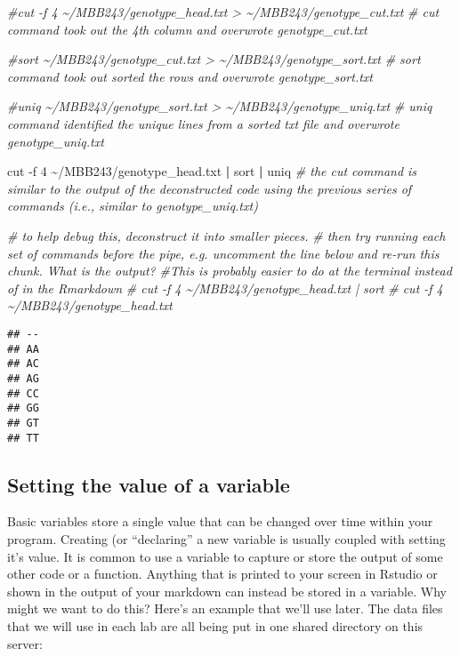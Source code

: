 \documentclass[
]{article}
\newenvironment{Shaded}{\begin{snugshade}}{\end{snugshade}}
\newcommand{\AttributeTok}[1]{\textcolor[rgb]{0.77,0.63,0.00}{#1}}
\newcommand{\CommentTok}[1]{\textcolor[rgb]{0.56,0.35,0.01}{\textit{#1}}}
\newcommand{\FunctionTok}[1]{\textcolor[rgb]{0.00,0.00,0.00}{#1}}
\newcommand{\KeywordTok}[1]{\textcolor[rgb]{0.13,0.29,0.53}{\textbf{#1}}}
\newcommand{\NormalTok}[1]{#1}
\begin{document}
\begin{Shaded}
\begin{Highlighting}[]
\CommentTok{\#cut {-}f 4 \textasciitilde{}/MBB243/genotype\_head.txt \textgreater{} \textasciitilde{}/MBB243/genotype\_cut.txt}
\CommentTok{\# cut command took out the 4th column and overwrote genotype\_cut.txt}

\CommentTok{\#sort \textasciitilde{}/MBB243/genotype\_cut.txt \textgreater{} \textasciitilde{}/MBB243/genotype\_sort.txt}
\CommentTok{\# sort command took out sorted the rows and overwrote genotype\_sort.txt}

\CommentTok{\#uniq \textasciitilde{}/MBB243/genotype\_sort.txt \textgreater{} \textasciitilde{}/MBB243/genotype\_uniq.txt}
\CommentTok{\# uniq command identified the unique lines from a sorted txt file and overwrote genotype\_uniq.txt}

\FunctionTok{cut} \AttributeTok{{-}f}\NormalTok{ 4 \textasciitilde{}/MBB243/genotype\_head.txt }\KeywordTok{|} \FunctionTok{sort} \KeywordTok{|} \FunctionTok{uniq}
\CommentTok{\# the cut command is similar to the output of the deconstructed code using the previous series of commands (i.e., similar to genotype\_uniq.txt)}

\CommentTok{\# to help debug this, deconstruct it into smaller pieces.}
\CommentTok{\# then try running each set of commands before the pipe, e.g. uncomment the line below and re{-}run this chunk. What is the output?  }
\CommentTok{\#This is probably easier to do at the terminal instead of in the Rmarkdown}
\CommentTok{\# cut {-}f 4 \textasciitilde{}/MBB243/genotype\_head.txt | sort }
\CommentTok{\# cut {-}f 4 \textasciitilde{}/MBB243/genotype\_head.txt }
\end{Highlighting}
\end{Shaded}

\begin{verbatim}
## --
## AA
## AC
## AG
## CC
## GG
## GT
## TT
\end{verbatim}

\hypertarget{setting-the-value-of-a-variable}{%
\subsection{Setting the value of a
variable}\label{setting-the-value-of-a-variable}}

Basic variables store a single value that can be changed over time
within your program. Creating (or ``declaring'' a new variable is
usually coupled with setting it's value. It is common to use a variable
to capture or store the output of some other code or a function.
Anything that is printed to your screen in Rstudio or shown in the
output of your markdown can instead be stored in a variable. Why might
we want to do this? Here's an example that we'll use later. The data
files that we will use in each lab are all being put in one shared
directory on this server:
\end{document}
